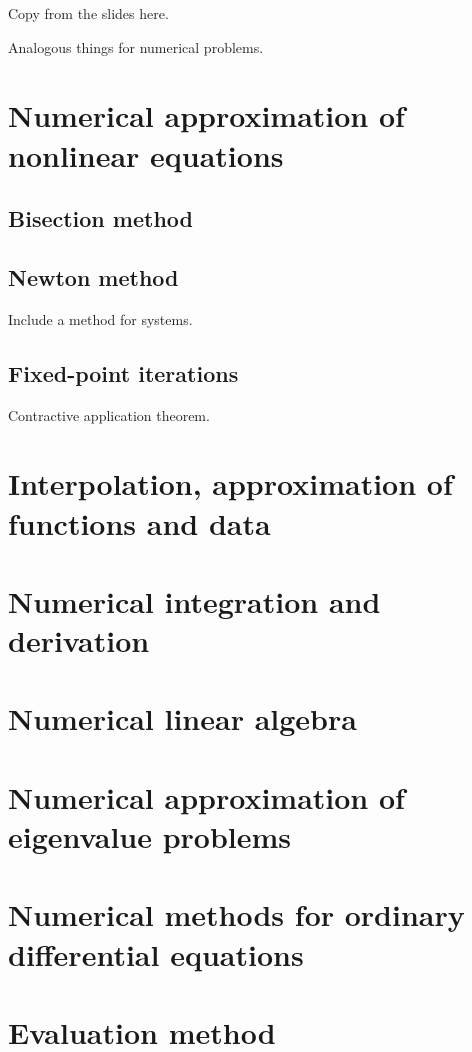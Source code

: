 \documentclass[palatino]{epflnotes}
\begin{document}
Copy from the slides here.

Analogous things for numerical problems.

\chapter{Numerical approximation of nonlinear equations}

\section{Bisection method}

\section{Newton method}

Include a method for systems.

\section{Fixed-point iterations}

Contractive application theorem.

\chapter{Interpolation, approximation of functions and data}

\chapter{Numerical integration and derivation}

\chapter{Numerical linear algebra}

\chapter{Numerical approximation of eigenvalue problems}

\chapter{Numerical methods for ordinary differential equations}

\appendix

\chapter{Evaluation method}
\end{document}
